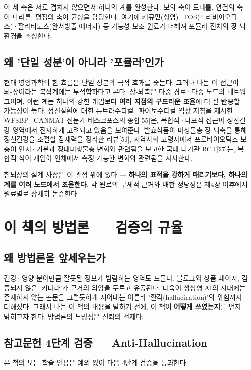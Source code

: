 \documentclass[11pt,oneside]{book}
\begin{document}
이 세 축은 서로 겹치지 않으면서 하나의 계를 완성한다. 보의 축이 토대를, 연결의 축이 다리를, 평정의 축이 균형을 담당한다. 여기에 커큐민(항염)·FOS(프리바이오틱스)·팔라티노스(완서방출 에너지) 등 기능성 보조 원료가 더해져 포뮬러 전체의 장-뇌 환경을 조성한다.

\subsection{왜 '단일 성분'이 아니라 '포뮬러'인가}
현대 영양과학의 한 흐름은 단일 성분의 극적 효과를 좇는다. 그러나 나는 이 접근이 뇌-장이라는 복잡계에는 부적합하다고 본다. 장-뇌축은 다중 경로·다중 노드의 네트워크이며, 이런 계는 하나의 강한 개입보다 \textbf{여러 지점의 부드러운 조율}에 더 잘 반응할 가능성이 높다. 정신질환에 대한 뉴트라수티컬·파이토수티컬 임상 지침을 제시한 WFSBP·CANMAT 전문가 태스크포스의 종합[55]은, 복합적·다표적 접근이 정신건강 영역에서 진지하게 고려되고 있음을 보여준다. 발효식품이 미생물총-장-뇌축을 통해 정신건강을 조절할 잠재력을 정리한 리뷰[56], 지역사회 고령자에서 프로바이오틱스 보충이 인지·기분과 장내미생물총 변화와 관련됨을 보고한 국내 다기관 RCT[57]는, 복합적 식이 개입이 인체에서 측정 가능한 변화와 관련됨을 시사한다.

힘뇌장의 설계 사상은 이 관점 위에 있다 — \textbf{하나의 표적을 강하게 때리기보다, 하나의 계를 여러 노드에서 조율한다.} 각 원료의 구체적 근거와 배합 정당성은 제4장 이후에서 원료별로 상세히 논증한다.

\section{이 책의 방법론 — 검증의 규율}
\subsection{왜 방법론을 앞세우는가}
건강·영양 분야만큼 잘못된 정보가 범람하는 영역도 드물다. 블로그와 상품 페이지, 검증되지 않은 '카더라'가 근거의 외양을 두르고 유통된다. 더욱이 생성형 AI의 시대에는 존재하지 않는 논문을 그럴듯하게 지어내는 이른바 '환각(hallucination)'의 위험까지 더해졌다. 그래서 나는 이 책의 내용을 말하기 전에, 이 책이 \textbf{어떻게 쓰였는지}를 먼저 밝히고자 한다. 방법론의 투명성은 신뢰의 전제다.

\subsection{참고문헌 4단계 검증 — Anti-Hallucination}
본 책의 모든 학술 인용은 예외 없이 다음 4단계 검증을 통과한다.
\end{document}
